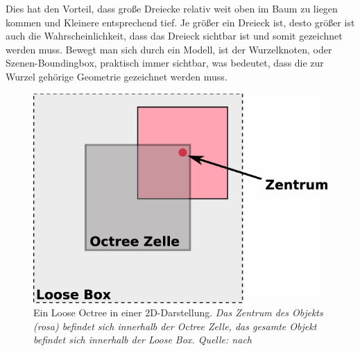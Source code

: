 Dies hat den Vorteil, dass große Dreiecke relativ weit oben im Baum zu liegen kommen und Kleinere entsprechend tief. Je größer ein Dreieck ist, desto größer ist auch die Wahrscheinlichkeit, dass das Dreieck sichtbar ist und somit gezeichnet werden muss. Bewegt man sich durch ein Modell, ist der Wurzelknoten, oder Szenen-Boundingbox, praktisch immer sichtbar, was bedeutet, dass die zur Wurzel gehörige Geometrie gezeichnet werden muss.
\begin{figure}
 \centering
  \includegraphics[scale=0.8]{images/looseoctree2.pdf}
  \caption{Ein Loose Octree in einer 2D-Darstellung. \textit{Das Zentrum des Objekts (rosa) befindet sich innerhalb der Octree Zelle, das gesamte Objekt befindet sich innerhalb der Loose Box. Quelle: nach }}
 \label{fig:basics:looseoctree}
\end{figure}

